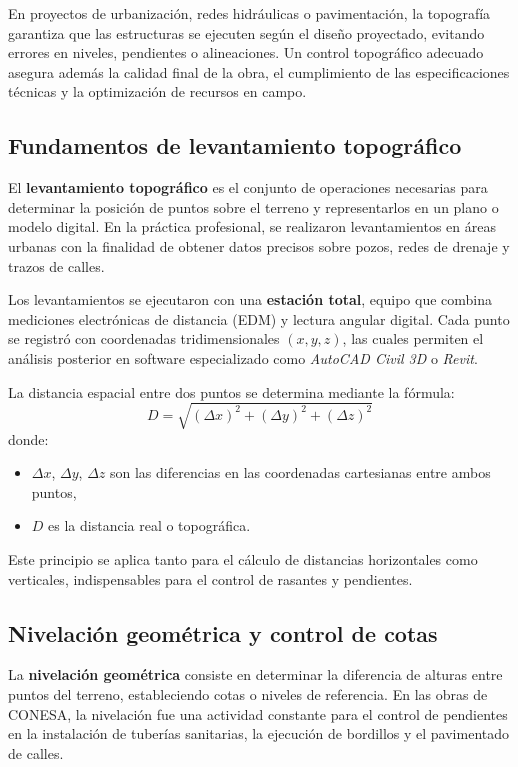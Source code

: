 \documentclass[12pt]{article}
\begin{document}
	En proyectos de urbanización, redes hidráulicas o pavimentación, la topografía garantiza que las estructuras se ejecuten según el diseño proyectado, evitando errores en niveles, pendientes o alineaciones.  
	Un control topográfico adecuado asegura además la calidad final de la obra, el cumplimiento de las especificaciones técnicas y la optimización de recursos en campo.
	
	\subsection{Fundamentos de levantamiento topográfico}
	
	El \textbf{levantamiento topográfico} es el conjunto de operaciones necesarias para determinar la posición de puntos sobre el terreno y representarlos en un plano o modelo digital.  
	En la práctica profesional, se realizaron levantamientos en áreas urbanas con la finalidad de obtener datos precisos sobre pozos, redes de drenaje y trazos de calles.
	
	Los levantamientos se ejecutaron con una \textbf{estación total}, equipo que combina mediciones electrónicas de distancia (EDM) y lectura angular digital.  
	Cada punto se registró con coordenadas tridimensionales $(x, y, z)$, las cuales permiten el análisis posterior en software especializado como \textit{AutoCAD Civil 3D} o \textit{Revit}.  
	
	La distancia espacial entre dos puntos se determina mediante la fórmula:
	\[
	D = \sqrt{(\Delta x)^2 + (\Delta y)^2 + (\Delta z)^2}
	\]
	donde:
	\begin{itemize}
		\item $\Delta x$, $\Delta y$, $\Delta z$ son las diferencias en las coordenadas cartesianas entre ambos puntos,
		\item $D$ es la distancia real o topográfica.
	\end{itemize}
	
	Este principio se aplica tanto para el cálculo de distancias horizontales como verticales, indispensables para el control de rasantes y pendientes.
	
	\subsection{Nivelación geométrica y control de cotas}
	
	La \textbf{nivelación geométrica} consiste en determinar la diferencia de alturas entre puntos del terreno, estableciendo cotas o niveles de referencia.  
	En las obras de CONESA, la nivelación fue una actividad constante para el control de pendientes en la instalación de tuberías sanitarias, la ejecución de bordillos y el pavimentado de calles.
	
\end{document}
